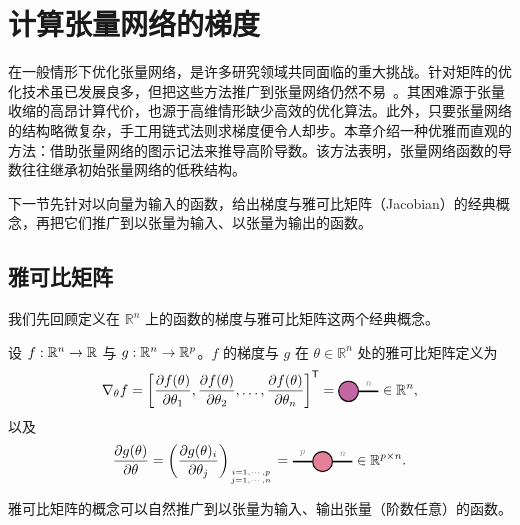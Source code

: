 \section{计算张量网络的梯度}\label{chapter:gradients}
在一般情形下优化张量网络，是许多研究领域共同面临的重大挑战。针对矩阵的优化技术虽已发展良多，但把这些方法推广到张量网络仍然不易~\citep{liao2019differentiable}。其困难源于张量收缩的高昂计算代价，也源于高维情形缺少高效的优化算法。此外，只要张量网络的结构略微复杂，手工用链式法则求梯度便令人却步。本章介绍一种优雅而直观的方法：借助张量网络的图示记法来推导高阶导数。该方法表明，张量网络函数的导数往往继承初始张量网络的低秩结构。

下一节先针对以向量为输入的函数，给出梯度与雅可比矩阵（Jacobian）的经典概念，再把它们推广到以张量为输入、以张量为输出的函数。
\subsection{雅可比矩阵}
我们先回顾定义在 $\mathbb{R}^n$ 上的函数的梯度与雅可比矩阵这两个经典概念。

\begin{definition}
  设 $f:\mathbb{R}^n\to\mathbb{R}$ 与 $g:\mathbb{R}^n\to\mathbb{R}^p$。$f$ 的梯度与 $g$ 在 $\theta\in\mathbb{R}^n$ 处的雅可比矩阵定义为
    $$\nabla_\theta f = \left[\frac{\partial f(\theta)}
{\partial\theta_1},\frac{\partial f(\theta)}{\partial\theta_2},\dots,\frac{\partial f(\theta)} 
    {\partial\theta_n}\right]^\ts
        =
    \begin{tikzpicture}[baseline=\baseline]
    \tikzset{tensor/.style = {minimum size = 0.5cm,shape = circle,thick,draw=black,inner sep = 0pt}, edge/.style   = {thick,line width=.4mm}}
    \def\y{0}
     \def\x{0}
    \node[tensor,fill=blue!40!red!60!white] (a1) at (\x,\y){};
    \draw[edge](a1) -- (\x+0.75,\y)node [midway, above]{\edgelabel{$n$}};
    \end{tikzpicture} \in\mathbb{R}^n,$$
    以及
    $$\frac{\partial g(\theta)}{\partial\theta} = \left(\frac{\partial g(\theta)_i}{\partial\theta_j}\right)_{i=1,\cdots,p\atop j=1,\cdots, n}
    =
    \begin{tikzpicture}[baseline=\baseline]
    \tikzset{tensor/.style = {minimum size = 0.5cm,shape = circle,thick,draw=black,inner sep = 0pt}, edge/.style   = {thick,line width=.4mm}}
    \def\y{0}
     \def\x{0}
    \node[tensor,fill=blue!20!red!50!white] (A) at (\x,\y){};
    \draw[edge](A) -- (\x+0.75,\y)node [midway, above]{\scalebox{0.7}{\dimcolor{$n$}}};
    \draw[edge](A) -- (\x-0.75,\y)node [midway, above]{\scalebox{0.7}{\dimcolor{$p$}}};
    \end{tikzpicture}\in\mathbb{R}^{p\times n}.$$  
\end{definition}
雅可比矩阵的概念可以自然推广到以张量为输入、输出张量（阶数任意）的函数。

